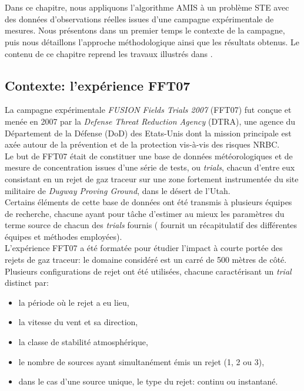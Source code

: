\setcounter{chapter}{2}

\chapter{}

Dans ce chapitre, nous appliquons l'algorithme AMIS à un problème STE avec des données d'observations réelles issues d'une campagne expérimentale de mesures. Nous présentons dans un premier temps le contexte de la campagne, puis nous détaillons l'approche méthodologique ainsi que les résultats obtenus. Le contenu de ce chapitre reprend les travaux illustrés dans \cite{Rajaona2015}.

\section{Contexte: l'expérience FFT07}

La campagne expérimentale \textit{FUSION Fields Trials 2007} (FFT07) fut conçue et menée en 2007 par la \textit{Defense Threat Reduction Agency} (DTRA), une agence du Département de la Défense (DoD) des Etats-Unis dont la mission principale est axée autour de la prévention et de la protection vis-à-vis des risques NRBC.\\

Le but de FFT07 était de constituer une base de données météorologiques et de mesure de concentration issues d'une série de tests, ou \textit{trials}, chacun d'entre eux consistant en un rejet de gaz traceur sur une zone fortement instrumentée du site militaire de \textit{Dugway Proving Ground}, dans le désert de l'Utah.\\

Certains éléments de cette base de données ont été transmis à plusieurs équipes de recherche, chacune ayant pour tâche d'estimer au mieux les paramètres du terme source de chacun des \textit{trials} fournis (\cite{Platt2010} fournit un récapitulatif des différentes équipes et méthodes employées).\\

L'expérience FFT07 a été formatée pour étudier l'impact à courte portée des rejets de gaz traceur: le domaine considéré est un carré de 500 mètres de côté. Plusieurs configurations de rejet ont été utilisées, chacune caractérisant un \textit{trial} distinct par:
\begin{itemize}
	\item la période  où le rejet a eu lieu,
	\item la vitesse du vent et sa direction,
	\item la classe de stabilité atmosphérique,
	\item le nombre de sources ayant simultanément émis un rejet (1, 2 ou 3),
	\item dans le cas d'une source unique, le type du rejet: continu ou instantané.\\
\end{itemize}

